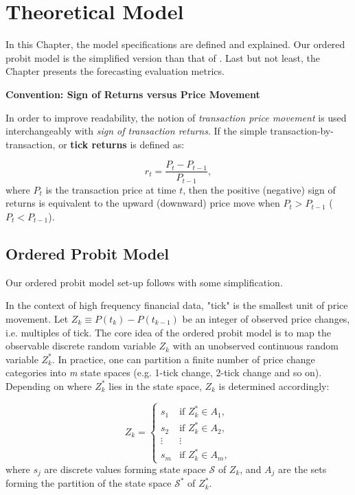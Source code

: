 \chapter{Theoretical Model}\label{chap:model}

In this Chapter, the model specifications are defined and explained. Our ordered probit model is the simplified version than that of \citet{hausman1992}. Last but not least, the Chapter presents the forecasting evaluation metrics.
\vspace{5mm}

{\noindent\bfseries Convention: Sign of Returns versus Price Movement}

In order to improve readability, the notion of \textit{transaction price movement} is used interchangeably with \textit{sign of transaction returns}. If the simple transaction-by-transaction, or \textbf{tick returns} is defined as:

\begin{equation}
    r_t = \frac{P_t - P_{t-1}}{P_{t-1}} ,
    \label{eq:1}
\end{equation}
where $P_t$ is the transaction price at time $t$, then the positive (negative) sign of returns is equivalent to the upward (downward) price move when \(P_t > P_{t-1}\) (\(P_t < P_{t-1}\)).

\section{Ordered Probit Model}

Our ordered probit model set-up follows \citet{hausman1992} with some simplification. 

In the context of high frequency financial data, "tick" is the smallest unit of price movement. Let $Z_k \equiv P(t_k) - P(t_{k-1})$ be an integer of observed price changes, i.e. multiples of tick. The core idea of the ordered probit model is to map the observable discrete random variable $Z_k$ with an unobserved continuous random variable $Z^*_k$. In practice, one can partition a finite number of price change categories into \textit{m} state spaces (e.g. 1-tick change, 2-tick change and so on). Depending on where $Z^*_k$ lies in the state space, $Z_k$ is determined accordingly:

\begin{equation}
Z_k =
\begin{cases}
s_1 & \text{if } Z_k^* \in A_1, \\
s_2 & \text{if } Z_k^* \in A_2, \\
\vdots & \vdots \\
s_m & \text{if } Z_k^* \in A_m,
\end{cases}
    \label{eq:2}
\end{equation}
where $s_j$ are discrete values forming state space \(\mathscr{S}\) of $Z_k$, and $A_j$ are the sets forming the partition of the state space \(\mathscr{S^*}\) of $Z^*_k$. 

